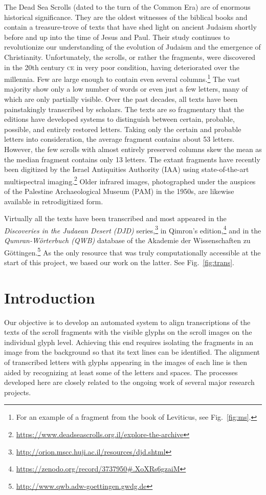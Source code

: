 The Dead Sea Scrolls (dated to the turn of the Common Era) are of enormous
historical significance.  They are the oldest witnesses of the biblical books
and contain a treasure-trove of texts that have shed light on ancient Judaism
shortly before and up into the time of Jesus and Paul.  Their study continues
to revolutionize our understanding of the evolution of Judaism and the
emergence of Christianity.  Unfortunately, the scrolls, or rather the
fragments, were discovered in the 20th century \textsc{ce} in very poor
condition, having deteriorated over the millennia.  Few are large enough to
contain even several columns.\footnote{For an example of a fragment from the
book of Leviticus, see Fig.~\ref{fig:ms}.} The vast majority show only a low
number of words or even just a few letters, many of which are only partially
visible.  Over the past decades, all texts have been painstakingly transcribed
by scholars.  The texts are so fragmentary that the editions have developed
systems to distinguish between certain, probable, possible, and entirely
restored letters.  Taking only the certain and probable letters into
consideration, the average fragment contains about 53 letters.  However, the
few scrolls with almost entirely preserved columns skew the mean as the median
fragment contains only 13 letters.  The extant fragments have recently been
digitized by the Israel Antiquities Authority (IAA) using state-of-the-art
multispectral
imaging.\footnote{\url{https://www.deadseascrolls.org.il/explore-the-archive}}
Older infrared images, photographed under the auspices of the Palestine
Archaeological Museum (PAM) in the 1950s, are likewise available in
retrodigitized form.

Virtually all the texts have been transcribed and most appeared in the
\textit{Discoveries in the Judaean Desert (DJD)}
series,\footnote{\url{http://orion.mscc.huji.ac.il/resources/djd.shtml}} in
Qimron's
edition,\footnote{\url{https://zenodo.org/record/3737950\#.XoXRs6gzaiM}} and in
the \textit{Qumran-Wörterbuch (QWB)} database of the Akademie der
Wissenschaften zu
Göttingen.\footnote{\url{http://www.qwb.adw-goettingen.gwdg.de}} As the only
resource that was truly computationally accessible at the start of this
project, we based our work on the latter.  See Fig.~\ref{fig:trans}.

\section{Introduction}

Our objective is to develop an automated system to align transcriptions of the
texts of the scroll fragments with the visible glyphs on the scroll images on
the individual glyph level.  Achieving this end requires isolating the
fragments in an image from the background so that its text lines can be
identified.  The alignment of transcribed letters with glyphs appearing in the
images of each line is then aided by recognizing at least some of the letters
and spaces.  The processes developed here are closely related to the ongoing
work of several major research projects.

